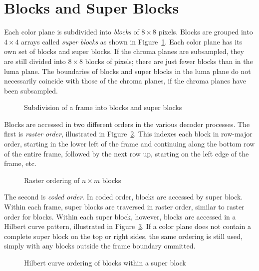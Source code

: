 \documentclass[11pt,letterpaper]{book}
\newcommand{\term}[1]{{\em #1}}
\numberwithin{equation}{chapter}
\numberwithin{figure}{chapter}
\numberwithin{table}{chapter}
\begin{document}
\section{Blocks and Super Blocks}
\label{sec:blocks-and-sbs}

Each color plane is subdivided into \term{blocks} of $8\times 8$ pixels.
Blocks are grouped into $4\times 4$ arrays called \term{super blocks} as
 shown in Figure~\ref{fig:superblock}.
Each color plane has its own set of blocks and super blocks.
If the chroma planes are subsampled, they are still divided into $8\times 8$
 blocks of pixels; there are just fewer blocks than in the luma plane.
The boundaries of blocks and super blocks in the luma plane do not necessarily
 coincide with those of the chroma planes, if the chroma planes have been
 subsampled.

\begin{figure}[htb]
\begin{center}

\end{center}
\caption{Subdivision of a frame into blocks and super blocks}
\label{fig:superblock}
\end{figure}

Blocks are accessed in two different orders in the various decoder processes.
The first is \term{raster order}, illustrated in Figure~\ref{fig:raster-block}.
This indexes each block in row-major order, starting in the lower left of the
 frame and continuing along the bottom row of the entire frame, followed by the
 next row up, starting on the left edge of the frame, etc.

\begin{figure}[htb]
\begin{center}

\end{center}
\caption{Raster ordering of $n\times m$ blocks}
\label{fig:raster-block}
\end{figure}

The second is \term{coded order}.
In coded order, blocks are accessed by super block.
Within each frame, super blocks are traversed in raster order,
 similar to raster order for blocks.
Within each super block, however, blocks are accessed in a Hilbert curve
 pattern, illustrated in Figure~\ref{fig:hilbert-block}.
If a color plane does not contain a complete super block on the top or right
 sides, the same ordering is still used, simply with any blocks outside the
 frame boundary ommitted.

\begin{figure}[htb]
\begin{center}

\end{center}
\caption{Hilbert curve ordering of blocks within a super block}
\label{fig:hilbert-block}
\end{figure}
\end{document}
